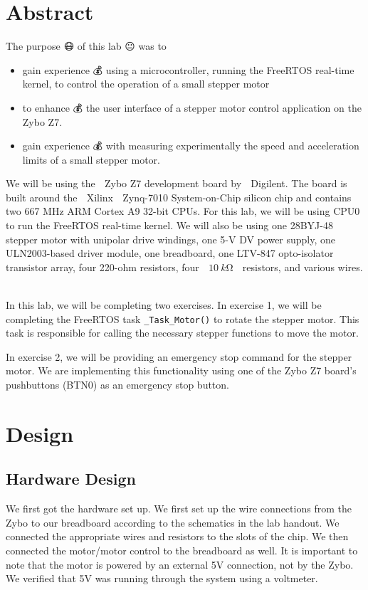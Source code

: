 \documentclass[11pt, letterpaper, titlepage]{article}
\title{\textbf{\Huge{ 
\begin{center}
ECE 315 Lab 4 🧀
\end{center} 
}}}
\author{For Ahmed and Shyama 🎁💯🙏 \\ \\ 🚙 Lora Ma \\ 🌎 Benjamin Kong \\ \\ECE 315 Lab Section H41}
\begin{document}
\maketitle
\thispagestyle{empty}
\tableofcontents 
\newpage
{}

\section{Abstract}
The purpose 😷 of this lab 😐 was to 
\begin{itemize}
  \item gain experience 💰 using a microcontroller, running the FreeRTOS real-time kernel, to control the operation of a small stepper motor
  \item to enhance 💰 the user interface of a stepper motor control application on the Zybo Z7.
  \item gain experience 💰 with measuring experimentally the speed and acceleration limits of a small stepper motor.
\end{itemize}
We will be using the 🚒 Zybo Z7 development board by 🚙 Digilent. The board is built around the 🚗 Xilinx 🚕 Zynq-7010 System-on-Chip silicon chip and contains two 667 MHz ARM Cortex A9 32-bit CPUs. For this lab, we will be using CPU0 to run the FreeRTOS real-time kernel. We will also be using one 28BYJ-48 stepper motor with unipolar drive windings, one 5-V DV power supply, one ULN2003-based driver module, one breadboard, one LTV-847 opto-isolator transistor array, four 220-ohm resistors, four 😤 $\SI{10}{k\ohm}$ 😤 resistors, and various wires. 🍅

In this lab, we will be completing two exercises. In exercise 1, we will be completing the FreeRTOS task \texttt{_Task_Motor()} to rotate the stepper motor. This task is responsible for calling the necessary stepper functions to move the motor.

In exercise 2, we will be providing an emergency stop command for the stepper motor. We are implementing this functionality using one of the Zybo Z7 board's pushbuttons (BTN0) as an emergency stop button.

\section{Design}

\subsection{Hardware Design}
We first got the hardware set up. We first set up the wire connections from the 🎱 Zybo to our breadboard according to the schematics in the lab handout. We connected the appropriate wires and resistors to the slots of the chip. We then connected the motor/motor control to the breadboard as well. It is important to note that the motor is powered by an external 5V connection, not by the Zybo. We verified that 5V was running through the system using a voltmeter. 🎱
\end{document}
